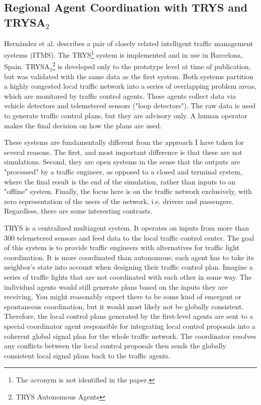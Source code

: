 \documentclass[11pt,letterpaper,onecolumn,twoside,openright,draft]{report}
\begin{document}
\subsection{Regional Agent Coordination with TRYS and TRYSA$_{2}$}
Hern\'{a}ndez et al.\cite{hernandez2001} describes a pair of closely related intelligent traffic management systems (ITMS).
The TRYS\footnote{The acronym is not identified in the paper.} system is implemented and in use in Barcelona, Spain.
TRYSA$_{2}$\footnote{TRYS Autonomous Agents} is developed only to the prototype level at time of publication, but was validated with the same data as the first system.
Both systems partition a highly congested local traffic network into a series of overlapping problem areas, which are monitored by traffic control agents.
These agents collect data via vehicle detectors and telemetered sensors ("loop detectors").
The raw data is used to generate traffic control plans, but they are advisory only.
A human operator makes the final decision on how the plans are used.

These systems are fundamentally different from the approach I have taken for several reasons.
The first, and most important difference is that these are not simulations.
Second, they are open systems in the sense that the outputs are "processed" by a traffic engineer, as opposed to a closed and terminal system, where the final result is the end of the simulation, rather than inputs to an "offline" system.
Finally, the focus here is on the traffic network exclusively, with zero representation of the users of the network, i.e. drivers and passengers.
Regardless, there are some interesting contrasts.

TRYS is a centralized multiagent system.
It operates on inputs from more than 300 telemetered sensors and feed data to the local traffic control center.
The goal of this system is to provide traffic engineers with alternatives for traffic light coordination.
It is more coordinated than autonomous; each agent has to take its neighbor's state into account when designing their traffic control plan.
Imagine a series of traffic lights that are not coordinated with each other in some way.
The individual agents would still generate plans based on the inputs they are receiving.
You might reasonably expect there to be some kind of emergent or spontaneous coordination, but it would most likely not be globally consistent.
Therefore, the local control plans generated by the first-level agents are sent to a special coordinator agent responsible for integrating local control proposals into a coherent global signal plan for the whole traffic network.
The coordinator resolves any conflicts between the local control proposals then sends the globally consistent local signal plans back to the traffic agents.
\end{document}

